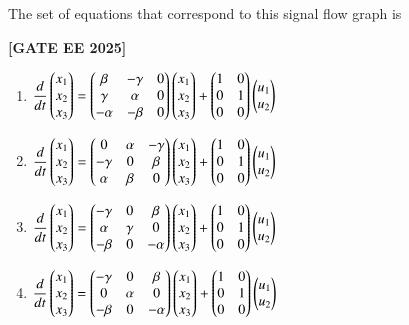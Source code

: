 \documentclass[12pt]{article}
\begin{document}
\begin{enumerate}[leftmargin=*, label=\textbf{Q.\arabic*:}]
The set of equations that correspond to this signal flow graph is
 
\noindent \textbf{[GATE EE 2025]}
\begin{enumerate}
  \item $\dfrac{d}{dt}
    \begin{pmatrix}
      x_1 \\ x_2 \\ x_3
    \end{pmatrix}
    =
    \begin{pmatrix}
      \beta & -\gamma & 0 \\
      \gamma & \alpha & 0 \\
      -\alpha & -\beta & 0
    \end{pmatrix}
    \begin{pmatrix}
      x_1 \\ x_2 \\ x_3
    \end{pmatrix}
    +
    \begin{pmatrix}
      1 & 0 \\
      0 & 1 \\
      0 & 0
    \end{pmatrix}
    \begin{pmatrix}
      u_1 \\ u_2
    \end{pmatrix}
   $
  \item $\dfrac{d}{dt}
    \begin{pmatrix}
      x_1 \\ x_2 \\ x_3
    \end{pmatrix}
    =
    \begin{pmatrix}
      0 & \alpha & -\gamma \\
      -\gamma & 0 & \beta \\
      \alpha & \beta & 0
    \end{pmatrix}
    \begin{pmatrix}
      x_1 \\ x_2 \\ x_3
    \end{pmatrix}
    +
    \begin{pmatrix}
      1 & 0 \\
      0 & 1 \\
      0 & 0
    \end{pmatrix}
    \begin{pmatrix}
      u_1 \\ u_2
    \end{pmatrix}
   $
  \item $\dfrac{d}{dt}
    \begin{pmatrix}
      x_1 \\ x_2 \\ x_3
    \end{pmatrix}
    =
    \begin{pmatrix}
      -\gamma & 0 & \beta \\
      \alpha & \gamma & 0 \\
      -\beta & 0 & -\alpha
    \end{pmatrix}
    \begin{pmatrix}
      x_1 \\ x_2 \\ x_3
    \end{pmatrix}
    +
    \begin{pmatrix}
      1 & 0 \\
      0 & 1 \\
      0 & 0
    \end{pmatrix}
    \begin{pmatrix}
      u_1 \\ u_2
    \end{pmatrix}
   $
  \item $\dfrac{d}{dt}
    \begin{pmatrix}
      x_1 \\ x_2 \\ x_3
    \end{pmatrix}
    =
    \begin{pmatrix}
      -\gamma & 0 & \beta \\
      0 & \alpha & 0 \\
      -\beta & 0 & -\alpha
    \end{pmatrix}
    \begin{pmatrix}
      x_1 \\ x_2 \\ x_3
    \end{pmatrix}
    +
    \begin{pmatrix}
      1 & 0 \\
      0 & 1 \\
      0 & 0
    \end{pmatrix}
    \begin{pmatrix}
      u_1 \\ u_2
    \end{pmatrix}
   $
\end{enumerate}


\end{enumerate}
\end{document}
